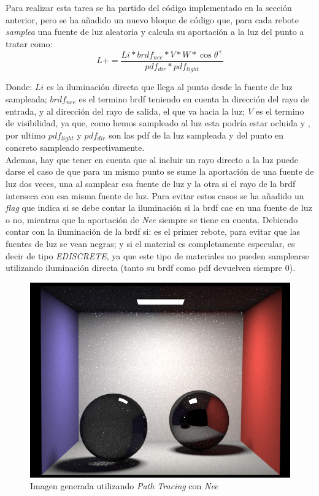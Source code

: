 \documentclass[10pt,oneside,a4paper]{article}
\begin{document}
Para realizar esta tarea se ha partido del código implementado en la sección anterior, pero se ha añadido un nuevo bloque de código que, para cada rebote \textit{samplea} una fuente de luz aleatoria y calcula su aportación a la luz del punto a tratar como:
$$ L += \frac{Li * brdf_{nee} * V * W * \cos\theta^+}{pdf_{dir} * pdf_{light}}$$

Donde: $Li$ es la iluminación directa que llega al punto desde la fuente de luz sampleada; $brdf_{nee}$ es el termino brdf teniendo en cuenta la dirección del rayo de entrada, y al dirección del rayo de salida, el que va hacia la luz; $V$ es el termino de visibilidad, ya que, como hemos sampleado al luz esta podría estar ocluida y , por ultimo $pdf_{light}$ y $pdf_{dir}$ son las pdf de la luz sampleada y del punto en concreto sampleado respectivamente. \\

Ademas, hay que tener en cuenta que al incluir un rayo directo a la luz puede darse el caso de que para un mismo punto se sume la aportación de una fuente de luz dos veces, una al samplear esa fuente de luz y la otra si el rayo de la brdf interseca con esa misma fuente de luz. Para evitar estos casos se ha añadido un \textit{flag} que indica si se debe contar la iluminación si la brdf cae en una fuente de luz o no, mientras que la aportación de \textit{Nee} siempre se tiene en cuenta. Debiendo contar con la iluminación de la brdf si: es el primer rebote, para evitar que las fuentes de luz se vean negras; y si el material es completamente especular, es decir de tipo \textit{EDISCRETE}, ya que este tipo de materiales no pueden samplearse utilizando iluminación directa (tanto su brdf como pdf devuelven siempre 0).\\

\begin{figure}[h]
\centering
\includegraphics[width=.6\linewidth]{images/cbox_pathNee_512.png}
\caption{Imagen generada utilizando \textit{Path Tracing} con \textit{Nee}}
\label{fig:disp}
\end{figure}
\end{document}
